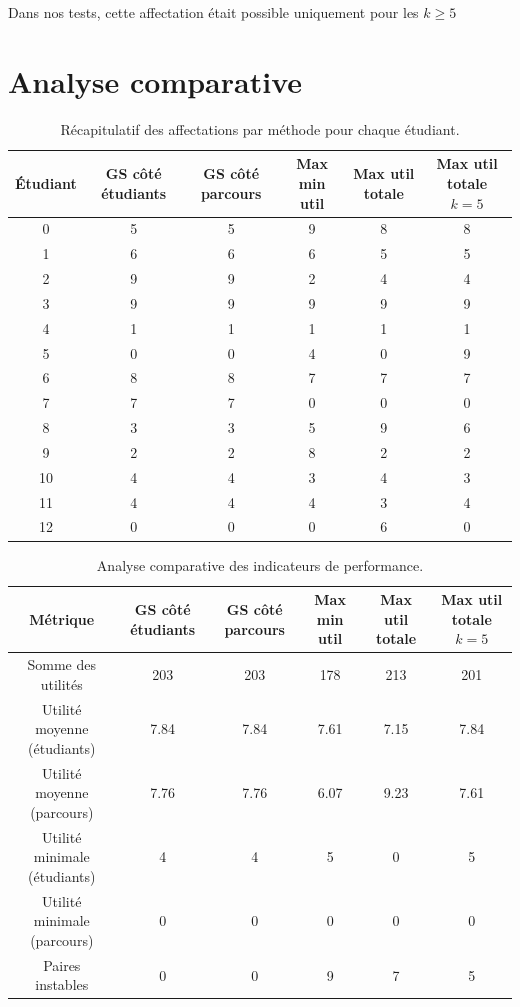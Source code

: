 \documentclass{article}
\begin{document}
Dans nos tests, cette affectation était possible uniquement pour les $k\geq 5$

\section{Analyse comparative}

\begin{table}
      \footnotesize
      \centering
      \begin{tabular}{|c c c c c c|}
            \hline
            Étudiant & GS côté étudiants & GS côté parcours & Max min util & Max util totale & Max util totale $k=5$\\
            \hline \hline
            0  & 5 & 5 & 9 & 8 & 8 \\
            1  & 6 & 6 & 6 & 5 & 5 \\
            2  & 9 & 9 & 2 & 4 & 4 \\
            3  & 9 & 9 & 9 & 9 & 9 \\
            4  & 1 & 1 & 1 & 1 & 1 \\
            5  & 0 & 0 & 4 & 0 & 9 \\
            6  & 8 & 8 & 7 & 7 & 7 \\
            7  & 7 & 7 & 0 & 0 & 0 \\
            8  & 3 & 3 & 5 & 9 & 6 \\
            9  & 2 & 2 & 8 & 2 & 2 \\
            10 & 4 & 4 & 3 & 4 & 3 \\
            11 & 4 & 4 & 4 & 3 & 4 \\
            12 & 0 & 0 & 0 & 6 & 0\\
            \hline
      \end{tabular}
      \caption{Récapitulatif des affectations par méthode pour chaque étudiant.}
      \label{tab:aff}
\end{table}

\begin{table}
      \centering
      \footnotesize
      \begin{tabular}{|c | c c c c c|}
            \hline
            Métrique & GS côté étudiants & GS côté parcours & Max min util & Max util totale & Max util totale $k=5$\\
            \hline \hline
            Somme des utilités            & 203  & 203   & 178  & 213   & 201 \\
            Utilité moyenne (étudiants)   & 7.84 & 7.84  & 7.61 & 7.15  & 7.84\\
            Utilité moyenne (parcours)    & 7.76 & 7.76  & 6.07 & 9.23  & 7.61\\
            Utilité minimale (étudiants)  & 4    & 4     & 5    & 0     & 5 \\
            Utilité minimale (parcours)   & 0    & 0     & 0    & 0     &  0 \\
            Paires instables              & 0    & 0     & 9    & 7     & 5 \\
            \hline
      \end{tabular}
      \caption{Analyse comparative des indicateurs de performance.}
      \label{tab:ut}
\end{table}
\end{document}
